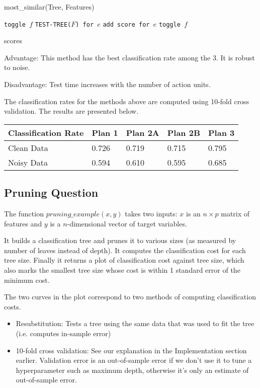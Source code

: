 \documentclass[12pt, a4paper]{article}
\begin{document}
\begin{algorithm}
\caption{most\_similar(Tree, Features)}\label{euclid}
\begin{algorithmic}[1]
        \State \texttt{toggle $f$}
        \State \texttt{TEST-TREE($F$) for $e$}
        \State \texttt{add score for $e$}
        \EndFor
		\State \texttt{toggle $f$}

\EndFor
\Return scores
\EndFunction
\label{code3}
\end{algorithmic}
\end{algorithm}

Advantage: This method has the best classification rate among the 3. It is robust to noise.\par
Disadvantage: Test time increases with the number of action units.\par
\bigskip
The classification rates for the methods above are computed using 10-fold cross validation. The results are presented below.
\begin{center}
\begin{tabular} { C{4cm} | C{1.5cm} C{1.5cm} C{1.5cm} C{1.5cm} }
    Classification Rate & Plan 1 & Plan 2A & Plan 2B & Plan 3 \\ \hline
    Clean Data & 0.726 & 0.719 & 0.715 & 0.795 \\
    Noisy Data & 0.594 & 0.610 & 0.595 & 0.685  \\
\end{tabular}
\label{table}
\end{center}

\subsection*{Pruning Question}
The function $pruning\_example(x, y)$ takes two inputs: $x$ is an $n \times p$ matrix of features and $y$ is a $n$-dimensional vector of target variables.\par
\bigskip
It builds a classification tree and prunes it to various sizes (as measured by number of leaves instead of depth). It computes the classification cost for each tree size. Finally it returns a plot of classification cost against tree size, which also marks the smallest tree size whose cost is within 1 standard error of the minimum cost.\par
\bigskip
The two curves in the plot correspond to two methods of computing classification costs.
\begin{itemize}
    \item Resubstitution: Tests a tree using the same data that was used to fit the tree (i.e. computes in-sample error)
    \item 10-fold cross validation: See our explanation in the Implementation section earlier. Validation error is an out-of-sample error if we don't use it to tune a hyperparameter such as maximum depth, otherwise it's only an estimate of out-of-sample error.
\end{itemize}
\end{document}
